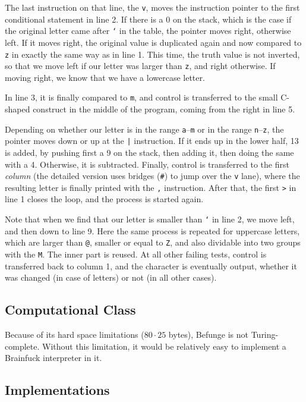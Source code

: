 The last instruction on that line, the \texttt{v}, moves the instruction pointer to the first conditional statement in line 2. If there is a 0 on the stack, which is the case if the original letter came after \texttt{`} in the \ascii{} table, the pointer moves right, otherwise left. If it moves right, the original value is duplicated again and now compared to \texttt{z} in exactly the same way as in line 1. This time, the truth value is not inverted, so that we move left if our letter was larger than \texttt{z}, and right otherwise. If moving right, we know that we have a lowercase letter.

In line 3, it is finally compared to \texttt{m}, and control is transferred to the small C-shaped construct in the middle of the program, coming from the right in line 5.

Depending on whether our letter is in the range \texttt{a}--\texttt{m} or in the range \texttt{n}--\texttt{z}, the pointer moves down or up at the \texttt{|} instruction. If it ends up in the lower half, 13 is added, by pushing first a 9 on the stack, then adding it, then doing the same with a 4. Otherwise, it is subtracted. Finally, control is transferred to the first \emph{column} (the detailed version uses bridges (\texttt{\#}) to jump over the \texttt{v} lane), where the resulting letter is finally printed with the \texttt{,} instruction. After that, the first \texttt{>} in line 1 closes the loop, and the process is started again.

Note that when we find that our letter is smaller than \texttt{`} in line 2, we move left, and then down to line 9. Here the same process is repeated for uppercase letters, which are larger than \texttt{@}, smaller or equal to \texttt{Z}, and also dividable into two groups with the \texttt{M}. The inner part is reused. At all other failing tests, control is transferred back to column 1, and the character is eventually output, whether it was changed (in case of letters) or not (in all other cases).

\subsection{Computational Class}

Because of its hard space limitations ($80\cdot 25$ bytes), Befunge is not Turing-complete. Without this limitation, it would be relatively easy to implement a Brainfuck interpreter in it.

\subsection{Implementations}

